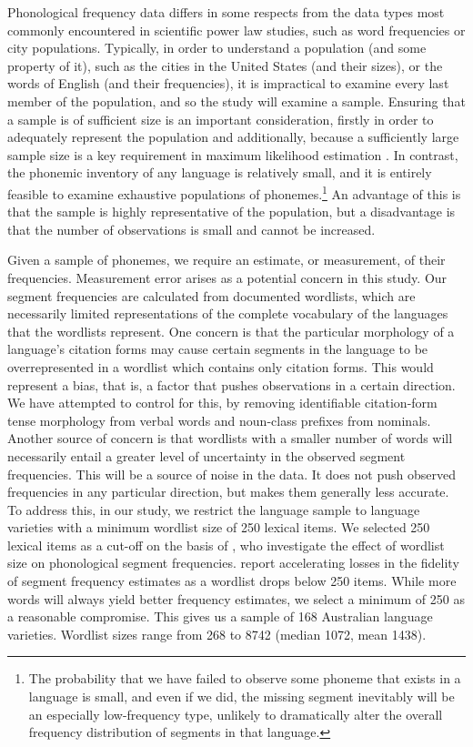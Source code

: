 Phonological frequency data differs in some respects from the data types most commonly encountered in scientific power law studies, such as word frequencies or city populations. Typically, in order to understand a population (and some property of it), such as the cities in the United States (and their sizes), or the words of English (and their frequencies), it is impractical to examine every last member of the population, and so the study will examine a sample. Ensuring that a sample is of sufficient size is an important consideration, firstly in order to adequately represent the population and additionally, because a sufficiently large sample size is a key requirement in maximum likelihood estimation \autocites{barndorff-nielsen_inference_1994}{newman_power_2005}. In contrast, the phonemic inventory of any language is relatively small, and it is entirely feasible to examine exhaustive populations of phonemes.\footnote{The probability that we have failed to observe some phoneme that exists in a language is small, and even if we did, the missing segment inevitably will be an especially low-frequency type, unlikely to dramatically alter the overall frequency distribution of segments in that language.} An advantage of this is that the sample is highly representative of the population, but a disadvantage is that the number of observations is small and cannot be increased.

Given a sample of phonemes, we require an estimate, or measurement, of their frequencies. Measurement error arises as a potential concern in this study. Our segment frequencies are calculated from documented wordlists, which are necessarily limited representations of the complete vocabulary of the languages that the wordlists represent. One concern is that the particular morphology of a language's citation forms may cause certain segments in the language to be overrepresented in a wordlist which contains only citation forms. This would represent a bias, that is, a factor that pushes observations in a certain direction. We have attempted to control for this, by removing identifiable citation-form tense morphology from verbal words and noun-class prefixes from nominals. Another source of concern is that wordlists with a smaller number of words will necessarily entail a greater level of uncertainty in the observed segment frequencies. This will be a source of noise in the data. It does not push observed frequencies in any particular direction, but makes them generally less accurate. To address this, in our study, we restrict the language sample to language varieties with a minimum wordlist size of 250 lexical items. We selected 250 lexical items as a cut-off on the basis of \textcite{dockum_swadesh_2019}, who investigate the effect of wordlist size on phonological segment frequencies. \textcite{dockum_swadesh_2019} report accelerating losses in the fidelity of segment frequency estimates as a wordlist drops below 250 items. While more words will always yield better frequency estimates, we select a minimum of 250 as a reasonable compromise. This gives us a sample of 168 Australian language varieties. Wordlist sizes range from 268 to 8742 (median 1072, mean 1438).

